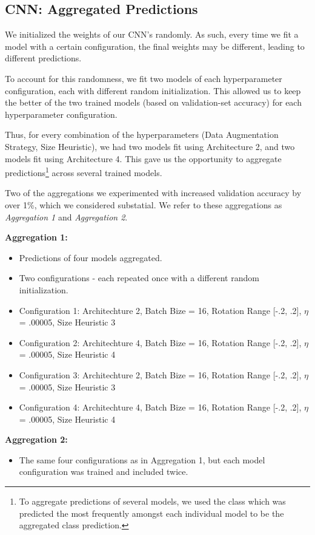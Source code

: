 \documentclass[letterpaper, 10 pt, conference]{ieeeconf}  %
\begin{document}
\subsection{CNN: Aggregated Predictions} 

We initialized the weights of our CNN's randomly. As such, every time we fit a model with a certain configuration, the final weights may be different, leading to different predictions. 

To account for this randomness, we fit two models of each hyperparameter configuration, each with different random initialization. This allowed us to keep the better of the two trained models (based on validation-set accuracy) for each hyperparameter configuration. 

Thus, for every combination of the hyperparameters (Data Augmentation Strategy, Size Heuristic), we had two models fit using Architecture 2, and two models fit using Architecture 4. This gave us the opportunity to aggregate predictions\footnote{To aggregate predictions of several models, we used the class which was predicted the most frequently amongst each individual model to be the aggregated class prediction.} across several trained models. 

Two of the aggregations we experimented with increased validation accuracy by over 1\%, which we considered substatial. We refer to these aggregations as \emph{Aggregation 1} and \emph{Aggregation 2}. 

\textbf{Aggregation 1:}
\begin{itemize}
\item Predictions of four models aggregated.
\item Two configurations - each repeated once with a different random initialization.
\item Configuration 1: Architechture 2, Batch Bize = 16, Rotation Range [-.2, .2], $\eta$ = .00005, Size Heuristic 3
\item Configuration 2: Architechture 4, Batch Bize = 16, Rotation Range [-.2, .2], $\eta$ = .00005, Size Heuristic 4
\item Configuration 3: Architechture 2, Batch Bize = 16, Rotation Range [-.2, .2], $\eta$ = .00005, Size Heuristic 3
\item Configuration 4: Architechture 4, Batch Bize = 16, Rotation Range [-.2, .2], $\eta$ = .00005, Size Heuristic 4
\end{itemize}
\textbf{Aggregation 2:}
\begin{itemize}
\item The same four configurations as in Aggregation 1, but each model configuration was trained and included twice.
\end{itemize}
\end{document}

